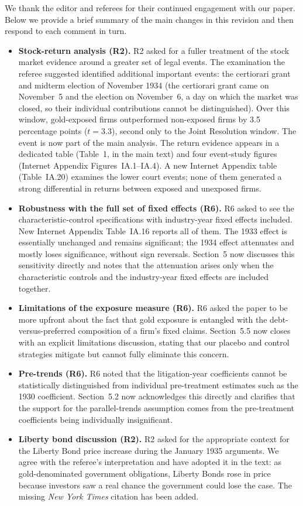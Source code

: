 \noindent We thank the editor and referees for their continued engagement with our paper. Below we provide a brief summary of the main changes in this revision and then respond to each comment in turn.

\begin{itemize}
\item \textbf{Stock-return analysis (R2).} R2 asked for a fuller treatment of the stock market evidence around a greater set of legal events. The examination the referee suggested identified additional important events: the certiorari grant and midterm election of November 1934 (the certiorari grant came on November~5 and the election on November~6, a day on which the market was closed, so their individual contributions cannot be distinguished). Over this window, gold-exposed firms outperformed non-exposed firms by 3.5 percentage points ($t = 3.3$), second only to the Joint Resolution window. The event is now part of the main analysis. The return evidence appears in a dedicated table (Table~1, in the main text) and four event-study figures (Internet Appendix Figures~IA.1--IA.4). A new Internet Appendix table (Table~IA.20) examines the lower court events; none of them generated a strong differential in returns between exposed and unexposed firms.
\item \textbf{Robustness with the full set of fixed effects (R6).} R6 asked to see the characteristic-control specifications with industry-year fixed effects included. New Internet Appendix Table~IA.16 reports all of them. The 1933 effect is essentially unchanged and remains significant; the 1934 effect attenuates and mostly loses significance, without sign reversals. Section~5 now discusses this sensitivity directly and notes that the attenuation arises only when the characteristic controls and the industry-year fixed effects are included together.
\item \textbf{Limitations of the exposure measure (R6).} R6 asked the paper to be more upfront about the fact that gold exposure is entangled with the debt-versus-preferred composition of a firm's fixed claims. Section~5.5 now closes with an explicit limitations discussion, stating that our placebo and control strategies mitigate but cannot fully eliminate this concern.
\item \textbf{Pre-trends (R6).} R6 noted that the litigation-year coefficients cannot be statistically distinguished from individual pre-treatment estimates such as the 1930 coefficient. Section~5.2 now acknowledges this directly and clarifies that the support for the parallel-trends assumption comes from the pre-treatment coefficients being individually insignificant.
\item \textbf{Liberty bond discussion (R2).} R2 asked for the appropriate context for the Liberty Bond price increase during the January 1935 arguments. We agree with the referee's interpretation and have adopted it in the text: as gold-denominated government obligations, Liberty Bonds rose in price because investors saw a real chance the government could lose the case. The missing \textit{New York Times} citation has been added.
\end{itemize}

